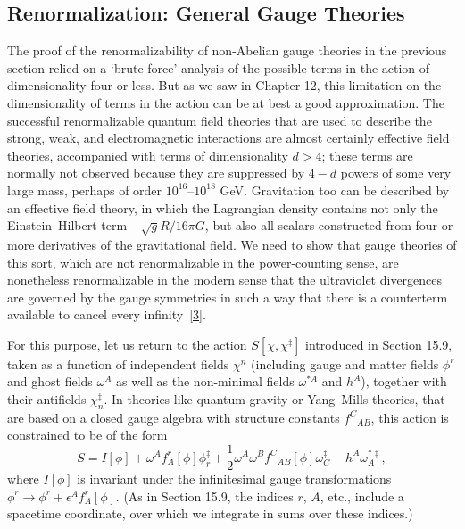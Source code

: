 \subsection[Renormalization: General Gauge Theories]{Renormalization: General Gauge Theories\footnotemark}

The proof of the renormalizability of non-Abelian gauge theories in the
previous section relied on a `brute force' analysis of the possible terms
in the action of dimensionality four or less. But as we saw in Chapter 12,
this limitation on the dimensionality of terms in the action can be at best
a good approximation. The successful renormalizable quantum field theories
that are used to describe the strong, weak, and electromagnetic interactions
are almost certainly effective field theories, accompanied with terms of
dimensionality $d>4$; these terms are normally not observed because they are
suppressed by $4-d$ powers of some very large mass, perhaps of order
$10^{16}$--$10^{18}$ GeV. Gravitation too can be described by an effective
field theory, in which the Lagrangian density contains not only the
Einstein--Hilbert term $-\sqrt{g}R/16\pi G$, but also all scalars constructed
from four or more derivatives of the gravitational field. We need to show
that gauge theories of this sort, which are not renormalizable in the
power-counting sense, are nonetheless renormalizable in the modern sense
that the ultraviolet divergences are governed by the gauge symmetries in
such a way that there is a counterterm available to cancel every
infinity~\hyperref[ch17-ref-3]{[3]}.

For this purpose, let us return to the action $S[\chi,\chi^{\ddagger}]$
introduced in Section 15.9, taken as a function of independent fields
$\chi^n$ (including gauge and matter fields $\phi^r$ and ghost fields
$\omega^A$ as well as the non-minimal fields $\omega^{*A}$ and $h^A$),
together with their antifields $\chi_n^{\ddagger}$. In theories like quantum
gravity or Yang--Mills theories, that are based on a closed gauge algebra
with structure constants $f^C{}_{AB}$, this action is constrained to be of
the form
\begin{equation}
S=I[\phi]+\omega^A f_A^r[\phi]\phi_r^{\ddagger}
+\frac12\omega^A\omega^B f^C{}_{AB}[\phi]\omega_C^{\ddagger}
-h^A\omega_A^{*\ddagger},
\label{eq:17.3.1}
\end{equation}
where $I[\phi]$ is invariant under the infinitesimal gauge transformations
$\phi^r\longrightarrow\phi^r+\epsilon^A f_A^r[\phi]$. (As in Section 15.9,
the indices $r$, $A$, etc., include a spacetime coordinate, over which we
integrate in sums over these indices.)

